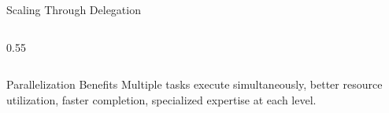 \documentclass[aspectratio=169,11pt]{beamer}
\begin{document}
\begin{frame}{Scaling Through Delegation}
\begin{columns}[T]
\begin{column}{0.55\textwidth}
\begin{center}
            \end{center}
        \end{column}
    \end{columns}

    \vspace{0.3cm}
    \begin{alertblock}{Parallelization Benefits}
        Multiple tasks execute simultaneously, better resource utilization, faster completion, specialized expertise at each level.
    \end{alertblock}
\end{frame}
\end{document}
